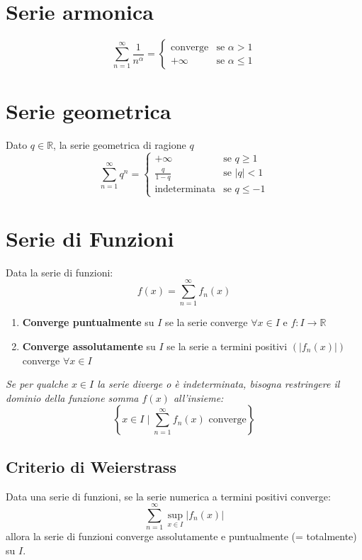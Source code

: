 \documentclass[10pt, a4paper]{article}
\begin{document}
\section{Serie armonica}
    \begin{equation*}
        \sum_{n=1}^{\infty}\frac{1}{n^\alpha} = \begin{cases}
            \text{converge} & \text{se }\alpha > 1\\
            +\infty & \text{se }\alpha\leq 1
        \end{cases}
    \end{equation*}
\section{Serie geometrica}
    Dato $q\in\mathbb{R}$, la serie geometrica di ragione $q$ 
    \begin{equation*}
        \sum_{n=1}^{\infty}q^n = \begin{cases}
            +\infty & \text{se } q\geq 1\\
            \frac{q}{1-q} & \text{se } |q|< 1\\
            \text{indeterminata} & \text{se }q\leq -1
        \end{cases}
    \end{equation*}
\section{Serie di Funzioni}
    Data la serie di funzioni:
    \begin{equation*}
        f(x) = \sum_{n=1}^{\infty}f_n(x)
    \end{equation*}
    \begin{enumerate}
        \item \textbf{Converge puntualmente} su $I$ se la serie converge $\forall x\in I$ e $f:I\rightarrow\mathbb{R}$
        \item \textbf{Converge assolutamente} su $I$ se la serie a termini positivi $\left(\left|f_n(x)\right|\right)$ converge $\forall x\in I$
    \end{enumerate}
    \textit{Se per qualche $x\in I$ la serie diverge o è indeterminata, bisogna restringere il dominio della funzione somma $f(x)$ all'insieme:} \begin{equation*}
        \left\{x\in I \mid \sum_{n=1}^{\infty}f_n(x) \text{ converge}\right\}
    \end{equation*}
    \subsection{Criterio di Weierstrass}
        Data una serie di funzioni, se la serie numerica a termini positivi converge:
        \begin{equation*}
            \sum_{n=1}^{\infty}\sup_{x\in I}\left|f_n(x)\right|
        \end{equation*}
        allora la serie di funzioni converge assolutamente e puntualmente (= totalmente) su $I$.
\end{document}
